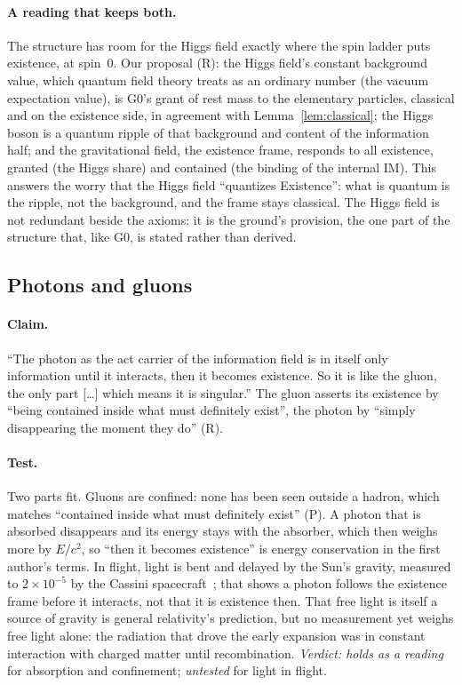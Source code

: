 \documentclass[11pt,a4paper]{article}
\theoremstyle{definition}
\newcommand{\tagR}{\textsf{(R)}}
\newcommand{\tagP}{\textsf{(P)}}
\begin{document}
\paragraph{A reading that keeps both.} The structure has room for the Higgs field exactly where the spin ladder puts existence, at spin~0.
Our proposal \tagR: the Higgs field's constant background value, which quantum field theory treats as an ordinary number (the vacuum
expectation value), is G0's grant of rest mass to the elementary particles, classical and on the existence side, in agreement with
Lemma~\ref{lem:classical}; the Higgs boson is a quantum ripple of that background and content of the information half; and the
gravitational field, the existence frame, responds to all existence, granted (the Higgs share) and contained (the binding of the internal
IM). This answers the worry that the Higgs field ``quantizes Existence'': what is quantum is the ripple, not the background, and the frame
stays classical. The Higgs field is not redundant beside the axioms: it is the ground's provision, the one part of the structure that, like
G0, is stated rather than derived.

\subsection{Photons and gluons}

\paragraph{Claim.} ``The photon as the act carrier of the information field is in itself only information until it interacts, then it
becomes existence. So it is like the gluon, the only part [\dots] which means it is singular.'' The gluon asserts its existence by ``being
contained inside what must definitely exist'', the photon by ``simply disappearing the moment they do'' \tagR.

\paragraph{Test.} Two parts fit. Gluons are confined: none has been seen outside a hadron, which matches ``contained inside what must
definitely exist'' \tagP. A photon that is absorbed disappears and its energy stays with the absorber, which then weighs more by $E/c^2$, so
``then it becomes existence'' is energy conservation in the first author's terms. In flight, light is bent and delayed by the Sun's
gravity, measured to $2\times10^{-5}$ by the Cassini spacecraft~\cite{cassini}; that shows a photon follows the existence frame before it
interacts, not that it is existence then. That free light is itself a source of gravity is general relativity's prediction, but no
measurement yet weighs free light alone: the radiation that drove the early expansion was in constant interaction with charged matter until
recombination. \emph{Verdict: holds as a reading} for absorption and confinement; \emph{untested} for light in flight.
\end{document}
